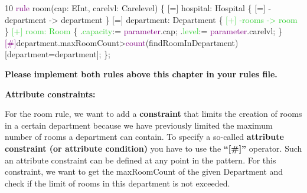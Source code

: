 {10\hspace{0.5cm} \textcolor{Purple}{rule} room(cap: EInt, carelvl: Carelevel) \{ \hspace{1cm}		[=] hospital: Hospital \{ \hspace{1.5cm}			[=] -department -> department \hspace{1cm}		\} \hspace{1cm}		[=] department: Department \{ \hspace{1.5cm}\textcolor{LimeGreen}{[+] -rooms -> room} \hspace{1cm}	\} \hspace{1cm}	\textcolor{LimeGreen}{[+] room: Room} \{ \hspace{1.5cm}	.\textcolor{LimeGreen}{capacity}:= \textcolor{Purple}{parameter}.cap; \hspace{1.5cm}	.\textcolor{LimeGreen}{level}:= \textcolor{Purple}{parameter}.carelvl; \hspace{1cm}\} \hspace{1cm}	\textcolor{Purple}{[\#]}department.maxRoomCount>\textcolor{Purple}{count}(findRoomInDepartment)[department=department]; \hspace{0.5cm}\}; \newline\newline

}

\textbf{Please implement both rules above this chapter in your rules file.}\newline

\clearpage

\textbf{Attribute constraints:}

For the room rule, we want to add a \textbf{constraint} that limits the creation of rooms in a certain department because we have previously limited the maximum number of rooms a department can contain. To specify a so-called \textbf{attribute constraint (or attribute condition)} you have to use the \textbf{“[\#]”} operator. Such an attribute constraint can be defined at any point in the pattern. For this constraint, we want to get the \textsf{maxRoomCount} of the given Department and check if the limit of rooms in this department is not exceeded.

